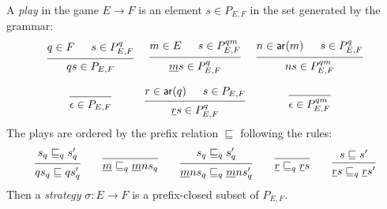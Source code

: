 \begin{definition}[Strategy] \label{def:strat}
  A \emph{play} in the game $E \rightarrow F$
  is an element $s \in P_{E,F}$
  in the set generated by the grammar:
  \[
    \begin{array}{cccc}
      \begin{prooftree}
        \hypo{q \in F}
        \hypo{s \in P_{E,F}^q}
        \infer2{qs \in P_{E,F}}
      \end{prooftree}
      &
      \begin{prooftree}
        \hypo{m \in E}
        \hypo{s \in P_{E,F}^{qm}}
        \infer2{\underline{m}s \in P_{E,F}^q}
      \end{prooftree}
      &
      \begin{prooftree}
        \hypo{n \in \kw{ar}(m)}
        \hypo{s \in P_{E,F}^q}
        \infer2{ns \in P_{E,F}^{qm}}
      \end{prooftree}
      \\[2em]
      \begin{prooftree}
        \infer0{\epsilon \in P_{E,F}}
      \end{prooftree}
      &
      \begin{prooftree}
        \hypo{r \in \kw{ar}(q)}
        \hypo{s \in P_{E,F}}
        \infer2{\underline{r}s \in P_{E,F}^q}
      \end{prooftree}
      &
      \begin{prooftree}
        \infer0{\epsilon \in P_{E,F}^{qm}}
      \end{prooftree}
    \end{array}
  \]
  The plays are ordered by the prefix relation $\sqsubseteq$
  following the rules:
  \[
    \begin{prooftree}
      \hypo{s_q \sqsubseteq_q s_q'}
      \infer1{q s_q \sqsubseteq q s_q'}
    \end{prooftree}
    \qquad
    \begin{prooftree}
      \infer0{\underline{m} \sqsubseteq_q \underline{m}n s_q}
    \end{prooftree}
    \qquad
    \begin{prooftree}
      \hypo{s_q \sqsubseteq_q s_q'}
      \infer1{\underline{m}n s_q \sqsubseteq_q \underline{m}n s_q'}
    \end{prooftree}
    \qquad
    \begin{prooftree}
      \infer0{\underline{r} \sqsubseteq_q \underline{r} s}
    \end{prooftree}
    \qquad
    \begin{prooftree}
      \hypo{s \sqsubseteq s'}
      \infer1{\underline{r} s \sqsubseteq_q \underline{r} s'}
    \end{prooftree}
  \]
  Then a \emph{strategy} $\sigma : E \rightarrow F$
  is a prefix-closed subset of $P_{E,F}$.
\end{definition}


